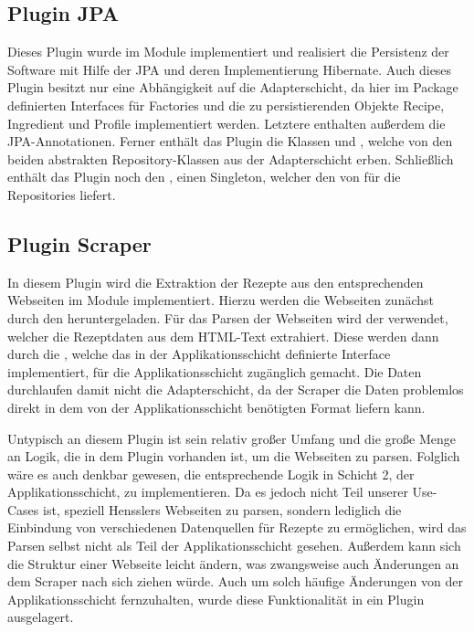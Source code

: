 \subsection{Plugin JPA}
Dieses Plugin wurde im Module \href{https://github.com/anditru/quickie/tree/bb41442c7f1ffbfcd3117cd86a40f7932e543a33/0-quickie-plugin-jpa}{} implementiert und realisiert die Persistenz der Software mit Hilfe der \ac{JPA} und deren Implementierung Hibernate. Auch dieses Plugin besitzt nur eine Abhängigkeit auf die Adapterschicht, da hier im Package \href{https://github.com/anditru/quickie/tree/bb41442c7f1ffbfcd3117cd86a40f7932e543a33/1-quickie-adapters/src/main/java/org/pinkcrazyunicorn/quickie/adapters/persistence}{} definierten Interfaces für Factories und die zu persistierenden Objekte Recipe, Ingredient und Profile implementiert werden. Letztere enthalten außerdem die \ac{JPA}-Annotationen. Ferner enthält das Plugin die Klassen  und , welche von den beiden abstrakten Repository-Klassen aus der Adapterschicht erben. Schließlich enthält das Plugin noch den , einen Singleton, welcher den  von  für die Repositories liefert.

\subsection{Plugin Scraper}
In diesem Plugin wird die Extraktion der Rezepte aus den entsprechenden Webseiten im Module \href{https://github.com/anditru/quickie/tree/bb41442c7f1ffbfcd3117cd86a40f7932e543a33/0-quickie-plugin-scraper}{} implementiert. Hierzu werden die Webseiten zunächst durch den  heruntergeladen. Für das Parsen der Webseiten wird der  verwendet, welcher die Rezeptdaten aus dem HTML-Text extrahiert. Diese werden dann durch die , welche das in der Applikationsschicht definierte Interface  implementiert, für die Applikationsschicht zugänglich gemacht. Die Daten durchlaufen damit nicht die Adapterschicht, da der Scraper die Daten problemlos direkt in dem von der Applikationsschicht benötigten Format liefern kann.

Untypisch an diesem Plugin ist sein relativ großer Umfang und die große Menge an Logik, die in dem Plugin vorhanden ist, um die Webseiten zu parsen. Folglich wäre es auch denkbar gewesen, die entsprechende Logik in Schicht 2, der Applikationsschicht, zu implementieren. Da es jedoch nicht Teil unserer Use-Cases ist, speziell Hensslers Webseiten zu parsen, sondern lediglich die Einbindung von verschiedenen Datenquellen für Rezepte zu ermöglichen, wird das Parsen selbst nicht als Teil der Applikationsschicht gesehen. Außerdem kann sich die Struktur einer Webseite leicht ändern, was zwangsweise auch Änderungen an dem Scraper nach sich ziehen würde. Auch um solch häufige Änderungen von der Applikationsschicht fernzuhalten, wurde diese Funktionalität in ein Plugin ausgelagert.

